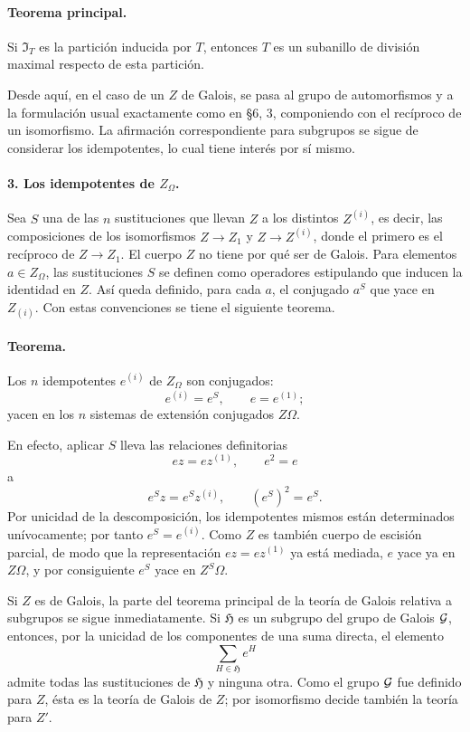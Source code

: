 \paragraph{Teorema principal.}
Si \(\mathfrak I_T\) es la partición inducida por \(T\), entonces \(T\) es un subanillo de división maximal respecto de esta partición.

Desde aquí, en el caso de un \(Z\) de Galois, se pasa al grupo de automorfismos y a la formulación usual exactamente como en §6, 3, componiendo con el recíproco de un isomorfismo. La afirmación correspondiente para subgrupos se sigue de considerar los idempotentes, lo cual tiene interés por sí mismo.

\paragraph{3. Los idempotentes de \(Z_\Omega\).}
Sea \(S\) una de las \(n\) sustituciones que llevan \(Z\) a los distintos \(Z^{(i)}\), es decir, las composiciones de los isomorfismos \(Z\to Z_1\) y \(Z\to Z^{(i)}\), donde el primero es el recíproco de \(Z\to Z_1\). El cuerpo \(Z\) no tiene por qué ser de Galois. Para elementos \(a\in Z_\Omega\), las sustituciones \(S\) se definen como operadores estipulando que inducen la identidad en \(Z\). Así queda definido, para cada \(a\), el conjugado \(a^S\) que yace en \(Z_{(i)}\). Con estas convenciones se tiene el siguiente teorema.

\paragraph{Teorema.}
Los \(n\) idempotentes \(e^{(i)}\) de \(Z_\Omega\) son conjugados:
\[
        e^{(i)}=e^S,
        \qquad e=e^{(1)};
\]
yacen en los \(n\) sistemas de extensión conjugados \(Z\Omega\).

En efecto, aplicar \(S\) lleva las relaciones definitorias
\[
        ez=ez^{(1)},
        \qquad e^2=e
\]
a
\[
        e^S z=e^S z^{(i)},
        \qquad (e^S)^2=e^S .
\]
Por unicidad de la descomposición, los idempotentes mismos están determinados unívocamente; por tanto \(e^S=e^{(i)}\). Como \(Z\) es también cuerpo de escisión parcial, de modo que la representación \(ez=ez^{(1)}\) ya está mediada, \(e\) yace ya en \(Z\Omega\), y por consiguiente \(e^S\) yace en \(Z^S\Omega\).

Si \(Z\) es de Galois, la parte del teorema principal de la teoría de Galois relativa a subgrupos se sigue inmediatamente. Si \(\mathfrak H\) es un subgrupo del grupo de Galois \(\mathcal G\), entonces, por la unicidad de los componentes de una suma directa, el elemento
\[
        \sum_{H\in\mathfrak H} e^H
\]
admite todas las sustituciones de \(\mathfrak H\) y ninguna otra. Como el grupo \(\mathcal G\) fue definido para \(Z\), ésta es la teoría de Galois de \(Z\); por isomorfismo decide también la teoría para \(Z'\).

